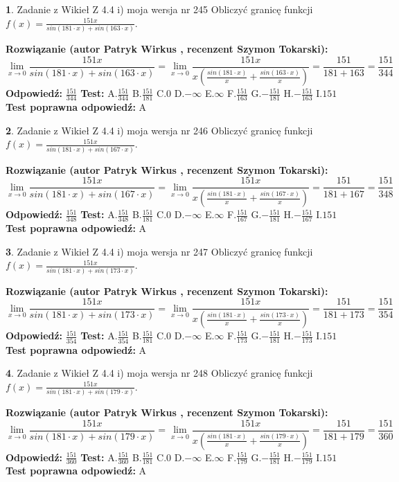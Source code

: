 \documentclass[12pt, a4paper]{article}
\theoremstyle{definition} %
\newtheorem{zad}{}
\newcommand{\zadStart}[1]{\begin{zad}#1\newline}
\newcommand{\zadStop}{\end{zad}}
\newcommand{\rozwStart}[2]{\noindent \textbf{Rozwiązanie (autor #1 , recenzent #2): }\newline}
\newcommand{\rozwStop}{\newline}
\newcommand{\odpStart}{\noindent \textbf{Odpowiedź:}\newline}
\newcommand{\odpStop}{\newline}
\newcommand{\testStart}{\noindent \textbf{Test:}\newline}
\newcommand{\testStop}{\newline}
\newcommand{\kluczStart}{\noindent \textbf{Test poprawna odpowiedź:}\newline}
\newcommand{\kluczStop}{\newline}
\begin{document}
\zadStart{Zadanie z Wikieł Z 4.4 i) moja wersja nr 245}
Obliczyć granicę funkcji $f(x)=\frac{151x}{sin(181\cdot x) +sin(163\cdot x)}$.
\zadStop
\rozwStart{Patryk Wirkus}{Szymon Tokarski}
$$\lim\limits_{x\to 0}\frac{151x}{sin(181\cdot x) +sin(163\cdot x)}=\lim\limits_{x\to 0}\frac{151x}{x(\frac{sin(181\cdot x)}{x}+\frac{sin(163\cdot x)}{x})}=\frac{151}{181+163} = \frac{151}{344}$$
\rozwStop
\odpStart
$\frac{151}{344}$
\odpStop
\testStart
A.$\frac{151}{344}$
B.$\frac{151}{181}$
C.$0$
D.$-\infty$
E.$\infty$
F.$\frac{151}{163}$
G.$-\frac{151}{181}$
H.$-\frac{151}{163}$
I.$151$
\testStop
\kluczStart
A
\kluczStop



\zadStart{Zadanie z Wikieł Z 4.4 i) moja wersja nr 246}
Obliczyć granicę funkcji $f(x)=\frac{151x}{sin(181\cdot x) +sin(167\cdot x)}$.
\zadStop
\rozwStart{Patryk Wirkus}{Szymon Tokarski}
$$\lim\limits_{x\to 0}\frac{151x}{sin(181\cdot x) +sin(167\cdot x)}=\lim\limits_{x\to 0}\frac{151x}{x(\frac{sin(181\cdot x)}{x}+\frac{sin(167\cdot x)}{x})}=\frac{151}{181+167} = \frac{151}{348}$$
\rozwStop
\odpStart
$\frac{151}{348}$
\odpStop
\testStart
A.$\frac{151}{348}$
B.$\frac{151}{181}$
C.$0$
D.$-\infty$
E.$\infty$
F.$\frac{151}{167}$
G.$-\frac{151}{181}$
H.$-\frac{151}{167}$
I.$151$
\testStop
\kluczStart
A
\kluczStop



\zadStart{Zadanie z Wikieł Z 4.4 i) moja wersja nr 247}
Obliczyć granicę funkcji $f(x)=\frac{151x}{sin(181\cdot x) +sin(173\cdot x)}$.
\zadStop
\rozwStart{Patryk Wirkus}{Szymon Tokarski}
$$\lim\limits_{x\to 0}\frac{151x}{sin(181\cdot x) +sin(173\cdot x)}=\lim\limits_{x\to 0}\frac{151x}{x(\frac{sin(181\cdot x)}{x}+\frac{sin(173\cdot x)}{x})}=\frac{151}{181+173} = \frac{151}{354}$$
\rozwStop
\odpStart
$\frac{151}{354}$
\odpStop
\testStart
A.$\frac{151}{354}$
B.$\frac{151}{181}$
C.$0$
D.$-\infty$
E.$\infty$
F.$\frac{151}{173}$
G.$-\frac{151}{181}$
H.$-\frac{151}{173}$
I.$151$
\testStop
\kluczStart
A
\kluczStop



\zadStart{Zadanie z Wikieł Z 4.4 i) moja wersja nr 248}
Obliczyć granicę funkcji $f(x)=\frac{151x}{sin(181\cdot x) +sin(179\cdot x)}$.
\zadStop
\rozwStart{Patryk Wirkus}{Szymon Tokarski}
$$\lim\limits_{x\to 0}\frac{151x}{sin(181\cdot x) +sin(179\cdot x)}=\lim\limits_{x\to 0}\frac{151x}{x(\frac{sin(181\cdot x)}{x}+\frac{sin(179\cdot x)}{x})}=\frac{151}{181+179} = \frac{151}{360}$$
\rozwStop
\odpStart
$\frac{151}{360}$
\odpStop
\testStart
A.$\frac{151}{360}$
B.$\frac{151}{181}$
C.$0$
D.$-\infty$
E.$\infty$
F.$\frac{151}{179}$
G.$-\frac{151}{181}$
H.$-\frac{151}{179}$
I.$151$
\testStop
\kluczStart
A
\kluczStop
\end{document}
